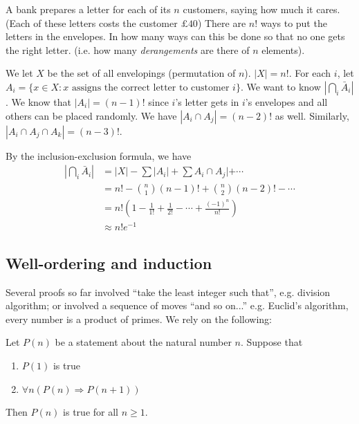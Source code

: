 \documentclass[a4paper]{article}
\begin{document}
  \begin{eg}
    A bank prepares a letter for each of its $n$ customers, saying how much it cares. (Each of these letters costs the customer $\pounds 40$) There are $n!$ ways to put the letters in the envelopes. In how many ways can this be done so that no one gets the right letter. (i.e. how many \emph{derangements} are there of $n$ elements).

    We let $X$ be the set of all envelopings (permutation of $n$). $|X| = n!$. For each $i$, let $A_i = \{x\in X: x \text{ assigns the correct letter to customer }i\}$. We want to know $|\bigcap_i \bar A_i|$. We know that $|A_i| = (n - 1)!$ since $i$'s letter gets in $i$'s envelopes and all others can be placed randomly. We have $|A_i\cap A_j| = (n - 2)!$ as well. Similarly, $|A_i\cap A_j \cap A_k| = (n - 3)!$.

    By the inclusion-exclusion formula, we have
    \begin{align*}
      |\bigcap_i \bar A_i| &= |X| - \sum |A_i| + \sum A_i\cap A_j| + \cdots\\
      &= n! - \binom{n}{1}(n - 1)! + \binom{n}{2}(n - 2)! - \cdots\\
      &= n!\left(1 - \frac{1}{1!} + \frac{1}{2!} - \cdots + \frac{(-1)^n}{n!}\right)\\
      &\approx n! e^{-1}
    \end{align*}
  \end{eg}
  \subsection{Well-ordering and induction}
  Several proofs so far involved ``take the least integer such that'', e.g. division algorithm; or involved a sequence of moves ``and so on...'' e.g. Euclid's algorithm, every number is a product of primes. We rely on the following:
  \begin{thm}
    Let $P(n)$ be a statement about the natural number $n$. Suppose that 
    \begin{enumerate}
      \item $P(1)$ is true
      \item $\forall n(P(n)\Rightarrow P(n + 1))$
    \end{enumerate}
    Then $P(n)$ is true for all $n\geq 1$.
  \end{thm}
\end{document}
